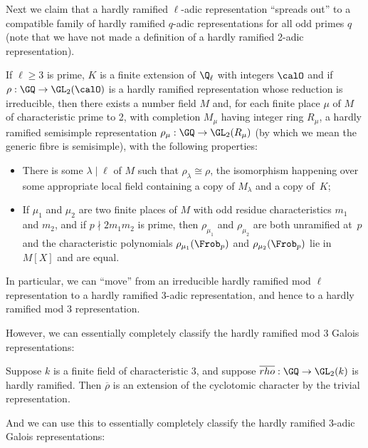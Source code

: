 Next we claim that a hardly ramified $\ell$-adic representation ``spreads out'' to a compatible
family of hardly ramified $q$-adic representations for all odd primes $q$ (note that we have
not made a definition of a hardly ramified 2-adic representation).

\begin{theorem}
  \label{hardly-ramified-spreads-out}
  If $\ell\geq3$ is prime, $K$ is a finite extension of $\Q_\ell$
  with integers $\calO$ and if $\rho:\GQ\to\GL_2(\calO)$ is a hardly ramified representation
  whose reduction is irreducible,
  then there exists a number field $M$ and, for each finite place $\mu$ of $M$
  of characteristic prime to 2, with completion $M_\mu$ having integer ring $R_\mu$,
  a hardly ramified semisimple representation $\rho_\mu:\GQ\to\GL_2(R_\mu)$ (by which we
  mean the generic fibre is semisimple), with the following properties:
  \begin{itemize}
    \item There is some $\lambda\mid\ell$ of $M$ such that $\rho_\lambda\cong\rho$,
      the isomorphism happening over some appropriate local field containing a copy
      of $M_\lambda$ and a copy of~$K$;
    \item If $\mu_1$ and $\mu_2$ are two finite places of $M$ with odd residue characteristics $m_1$
      and $m_2$, and if $p\nmid 2m_1m_2$ is prime, then $\rho_{\mu_1}$ and $\rho_{\mu_2}$
      are both unramified at~$p$ and the characteristic polynomials $\rho_{\mu_1}(\Frob_p)$
      and $\rho_{\mu_2}(\Frob_p)$ lie in $M[X]$ and are equal.
  \end{itemize}
\end{theorem}

In particular, we can ``move'' from an irreducible hardly ramified mod $\ell$ representation
to a hardly ramified 3-adic representation, and hence to a hardly ramified mod 3 representation.

However, we can essentially completely classify the hardly ramified mod 3 Galois representations:

\begin{theorem}
  \label{hardly-ramified-mod3-reducible}
  Suppose $k$ is a finite field of characteristic 3, and suppose
  $\overline{rho}:\GQ\to\GL_2(k)$ is hardly ramified. Then $\overline{\rho}$ is an extension
  of the cyclotomic character by the trivial representation.
\end{theorem}

And we can use this to essentially completely classify the hardly ramified 3-adic Galois
representations:

